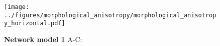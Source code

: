 


\begin{figure}[h]
\texttt{[image: ../figures/morphological\_anisotropy/morphological\_anisotropy\_horizontal.pdf]} %
\caption{{\bf Network model 1}
A-C:}
\label{fig_aniso}%
\end{figure}
